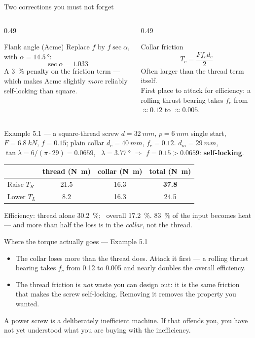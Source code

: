 \documentclass[aspectratio=169,10pt]{beamer}
\begin{document}
\begin{frame}{Two corrections you must not forget}
\begin{columns}[T]
\begin{column}{0.49\textwidth}
\begin{block}{Flank angle (Acme)}
Replace $f$ by $f\sec\alpha$, with $\alpha=\SI{14.5}{\degree}$:
\[ \sec\alpha = 1.033 \]
A \SI{3}{\percent} penalty on the friction term --- which makes Acme slightly \emph{more} reliably
self-locking than square.
\end{block}
\end{column}
\begin{column}{0.49\textwidth}
\begin{block}{Collar friction}
\[ T_c = \frac{F f_c d_c}{2} \]
Often \alert{larger than the thread term itself}.\\[5pt]
First place to attack for efficiency: a rolling thrust bearing takes $f_c$ from $\approx 0.12$ to
$\approx 0.005$.
\end{block}
\end{column}
\end{columns}
\end{frame}

\begin{frame}{Example 5.1 --- a square-thread screw}
$d=\SI{32}{mm}$, $p=\SI{6}{mm}$ single start, $F=\SI{6.8}{kN}$, $f=0.15$; plain collar
$d_c=\SI{40}{mm}$, $f_c=0.12$.
\vfill
$d_m = \SI{29}{mm}$, \ $\tan\lambda = 6/(\pi\cdot 29) = 0.0659$, \ $\lambda = \SI{3.77}{\degree}$
$\Rightarrow$ $f=0.15 > 0.0659$: \textbf{self-locking}.
\vfill
\centering\small
\begin{tabular}{@{}lccc@{}}
\toprule
 & thread (\si{N.m}) & collar (\si{N.m}) & total (\si{N.m})\\
\midrule
Raise $T_R$ & 21.5 & 16.3 & \textbf{37.8}\\
Lower $T_L$ & 8.2 & 16.3 & 24.5\\
\bottomrule
\end{tabular}
\vfill
\raggedright
Efficiency: thread alone \SI{30.2}{\percent}; \ \alert{overall \SI{17.2}{\percent}}.
\vfill
{\small \SI{83}{\percent} of the input becomes heat --- and more than half the loss is in the
\emph{collar}, not the thread.}
\end{frame}

\begin{frame}{Where the torque actually goes --- Example 5.1}
\centering
\resizebox{0.92\textwidth}{!}{}
\vfill
\raggedright
\begin{itemize}
  \item The \alert{collar} loses more than the thread does. Attack it first --- a rolling thrust
        bearing takes $f_c$ from 0.12 to 0.005 and nearly doubles the overall efficiency.
  \item The thread friction is \emph{not} waste you can design out: it is the same friction that makes
        the screw self-locking. Removing it removes the property you wanted.
\end{itemize}
\vfill
{\small A power screw is a deliberately inefficient machine. If that offends you, you have not yet
understood what you are buying with the inefficiency.}
\end{frame}
\end{document}
